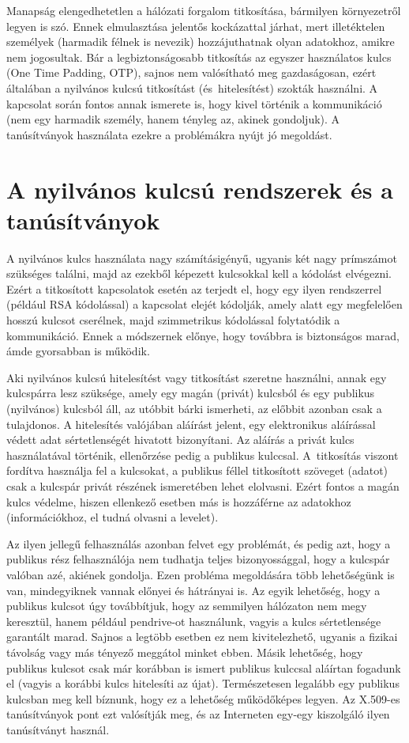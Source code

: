 
Manapság elengedhetetlen a hálózati forgalom titkosítása, bármilyen környezetről legyen is szó. Ennek elmulasztása
jelentős kockázattal járhat, mert illetéktelen személyek (harmadik félnek is nevezik) hozzájuthatnak olyan adatokhoz,
amikre nem jogosultak. Bár a legbiztonságosabb titkosítás az egyszer használatos kulcs (One Time Padding, OTP), sajnos
nem valósítható meg gazdaságosan, ezért általában a nyilvános kulcsú titkosítást (és~hitelesítést) szokták
használni. A kapcsolat során fontos annak ismerete is, hogy kivel történik a kommunikáció (nem egy harmadik személy,
hanem tényleg az, akinek gondoljuk). A tanúsítványok használata ezekre a problémákra nyújt jó megoldást.


\section{A nyilvános kulcsú rendszerek és a tanúsítványok}
A nyilvános kulcs használata nagy számításigényű, ugyanis két nagy prímszámot szükséges találni, majd az ezekből
képezett kulcsokkal kell a kódolást elvégezni. Ezért a titkosított kapcsolatok esetén az terjedt el, hogy egy ilyen
rendszerrel (például RSA kódolással) a kapcsolat elejét kódolják, amely alatt egy megfelelően hosszú kulcsot cserélnek,
majd szimmetrikus kódolással folytatódik a kommunikáció. Ennek a módszernek előnye, hogy továbbra is biztonságos marad,
ámde gyorsabban is működik.

Aki nyilvános kulcsú hitelesítést vagy titkosítást szeretne használni, annak egy kulcspárra lesz szüksége, amely egy
magán (privát) kulcsból és egy publikus (nyilvános) kulcsból áll, az utóbbit bárki ismerheti, az előbbit azonban csak a
tulajdonos. A hitelesítés valójában aláírást jelent, egy elektronikus aláírással védett adat sértetlenségét hivatott
bizonyítani. Az aláírás a privát kulcs használatával történik, ellenőrzése pedig a publikus kulccsal. A~titkosítás
viszont fordítva használja fel a kulcsokat, a publikus féllel titkosított szöveget (adatot) csak a kulcspár privát
részének ismeretében lehet elolvasni. Ezért fontos a magán kulcs védelme, hiszen ellenkező esetben más is hozzáférne az
adatokhoz (információkhoz, el tudná olvasni a levelet).

Az ilyen jellegű felhasználás azonban felvet egy problémát, és pedig azt, hogy a publikus rész felhasználója nem
tudhatja teljes bizonyossággal, hogy a kulcspár valóban azé, akiének gondolja. Ezen probléma megoldására több
lehetőségünk is van, mindegyiknek vannak előnyei és hátrányai is. Az egyik lehetőség, hogy a publikus kulcsot úgy
továbbítjuk, hogy az semmilyen hálózaton nem megy keresztül, hanem például pendrive-ot használunk, vagyis a kulcs
sértetlensége garantált marad. Sajnos a legtöbb esetben ez nem kivitelezhető, ugyanis a fizikai távolság vagy más
tényező meggátol minket ebben. Másik lehetőség, hogy publikus kulcsot  csak már korábban is ismert publikus kulccsal
aláírtan fogadunk el (vagyis a korábbi kulcs hitelesíti az újat). Természetesen legalább egy publikus kulcsban meg kell
bíznunk, hogy ez a lehetőség működőképes legyen. Az X.509-es tanúsítványok pont ezt valósítják meg, és az Interneten
egy-egy kiszolgáló ilyen tanúsítványt használ.


